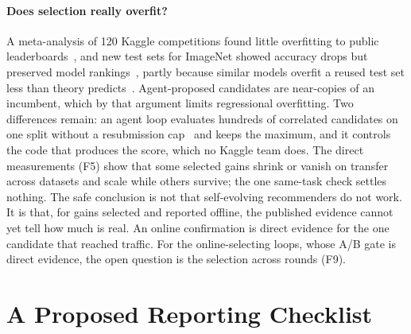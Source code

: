 \documentclass[sigconf,nonacm]{acmart}
\begin{document}
\paragraph{Does selection really overfit?} A meta-analysis of 120 Kaggle competitions found little overfitting to
public leaderboards~\cite{roelofs2019metaanalysis}, and new test sets for ImageNet showed accuracy drops but preserved
model rankings~\cite{recht2019imagenet}, partly because similar models overfit a reused test set less than theory
predicts~\cite{mania2019similarity}. Agent-proposed candidates are near-copies of an incumbent, which by that argument
limits regressional overfitting. Two differences remain: an agent loop evaluates hundreds of correlated candidates on
one split without a resubmission cap~\cite{blum2015ladder} and keeps the maximum, and it controls the code that produces
the score, which no Kaggle team does. The direct measurements (F5) show that some selected gains shrink or vanish on
transfer across datasets and scale while others survive; the one same-task check settles nothing. The safe conclusion is not that self-evolving recommenders do not work. It is that, for gains selected and reported offline, the
published evidence cannot yet tell how much is real. An online confirmation is direct evidence for the one candidate that reached traffic. For the online-selecting loops, whose A/B gate is direct evidence, the open question is the selection across rounds (F9).

\section{A Proposed Reporting Checklist}\label{sec:protocol}
\end{document}
